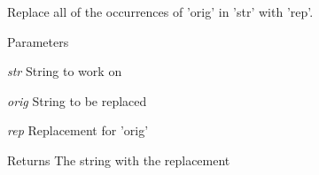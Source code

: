 Replace all of the occurrences of 'orig' in 'str' with 'rep'. 


\begin{DoxyParams}{Parameters}
\item[{\em str}]String to work on \item[{\em orig}]String to be replaced \item[{\em rep}]Replacement for 'orig' \end{DoxyParams}
\begin{DoxyReturn}{Returns}
The string with the replacement 
\end{DoxyReturn}
